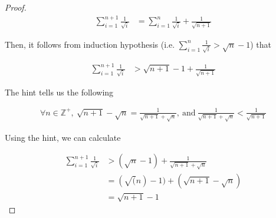 \documentclass[12pt]{article}
\begin{document}
\begin{itemize}
\begin{proof}
        \begin{align}
            \sum\limits_{i=1}^{n+1} \frac{1}{\sqrt{i}} &= \sum\limits_{i=1}^n \frac{1}{\sqrt{i}} + \frac{1}{\sqrt{n+1}}
        \end{align}

        \bigskip

        Then, it follows from induction hypothesis (i.e. $\sum\limits_{i=1}^{n} \frac{1}{\sqrt{i}} > \sqrt{n} - 1$) that

        \begin{align}
            \sum\limits_{i=1}^{n+1} \frac{1}{\sqrt{i}} &>  \sqrt{n+1} - 1 + \frac{1}{\sqrt{n+1}}
        \end{align}

        \bigskip

        The hint tells us the following

        \begin{align}
            \forall n \in \mathbb{Z}^{+},\:\sqrt{n+1} - \sqrt{n} = \frac{1}{\sqrt{n+1} + \sqrt{n}},\:\text{and}\:\frac{1}{\sqrt{n+1} + \sqrt{n}} < \frac{1}{\sqrt{n+1}}
        \end{align}

        \bigskip

        Using the hint, we can calculate

        \begin{align}
            \sum\limits_{i=1}^{n+1} \frac{1}{\sqrt{i}} &> (\sqrt{n}-1) + \frac{1}{\sqrt{n+1} + \sqrt{n}}\\
            &= (\sqrt(n) - 1) + (\sqrt{n+1} - \sqrt{n})\\
            &= \sqrt{n+1} - 1
        \end{align}
    \end{proof}

\end{itemize}
\end{document}
